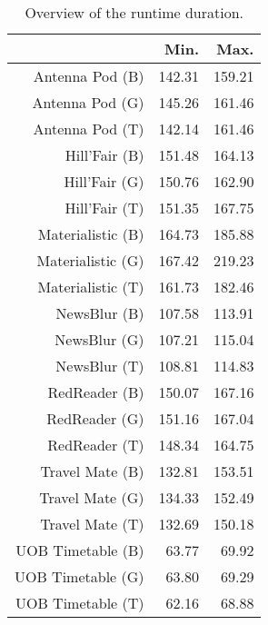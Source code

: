 \begin{table}[ht]
\centering
\begin{tabular}{rrr}
  \hline
 & Min. & Max. \\ 
  \hline
Antenna Pod (B) & 142.31 & 159.21 \\ 
  Antenna Pod (G) & 145.26 & 161.46 \\ 
  Antenna Pod (T) & 142.14 & 161.46 \\ 
  Hill'Fair (B) & 151.48 & 164.13 \\ 
  Hill'Fair (G) & 150.76 & 162.90 \\ 
  Hill'Fair (T) & 151.35 & 167.75 \\ 
  Materialistic (B) & 164.73 & 185.88 \\ 
  Materialistic (G) & 167.42 & 219.23 \\ 
  Materialistic (T) & 161.73 & 182.46 \\ 
  NewsBlur (B) & 107.58 & 113.91 \\ 
  NewsBlur (G) & 107.21 & 115.04 \\ 
  NewsBlur (T) & 108.81 & 114.83 \\ 
  RedReader (B) & 150.07 & 167.16 \\ 
  RedReader (G) & 151.16 & 167.04 \\ 
  RedReader (T) & 148.34 & 164.75 \\ 
  Travel Mate (B) & 132.81 & 153.51 \\ 
  Travel Mate (G) & 134.33 & 152.49 \\ 
  Travel Mate (T) & 132.69 & 150.18 \\ 
  UOB Timetable (B) & 63.77 & 69.92 \\ 
  UOB Timetable (G) & 63.80 & 69.29 \\ 
  UOB Timetable (T) & 62.16 & 68.88 \\ 
   \hline
\end{tabular}
\caption{Overview of the runtime duration.} 
\label{tab:results:rq1:summary:duration}
\end{table}

